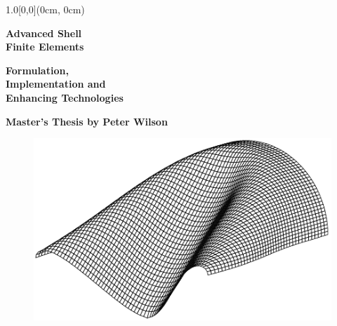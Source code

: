 \begin{textblock*}{1.0\textwidth}[0,0](0cm, 0cm)%
{\fontsize{50pt}{40pt}\selectfont\textbf{Advanced Shell \\ Finite Elements}\par}
{\fontsize{36pt}{30pt}\selectfont\textbf
	{\textcolor{gray75}{Formulation, \\ Implementation and \\ Enhancing Technologies}}\par
}



{\fontsize{24pt}{26pt}\selectfont\textbf{\textcolor{TUMblue}{Master's Thesis by Peter Wilson}}}
\end{textblock*}

\vspace*{102.2mm}

\begin{figure}[H]
	\centering
	\def\svgwidth{\columnwidth}
	\includegraphics[width=\textwidth]{./Ressourcen/titleimage.pdf}
\end{figure}



